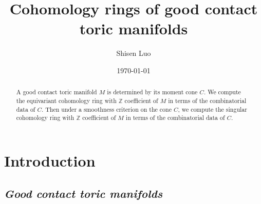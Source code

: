 \documentclass[12pt]{amsart}
\def\Z {{\mathbb{Z}}}
\theoremstyle{definition}
\numberwithin{equation}{section}
\begin{document}
\title{Cohomology rings of good contact toric manifolds}

\author{Shisen Luo}

\address{Department of Mathematics, Cornell University,
Ithaca, NY 14853-4201, USA}



\begin{abstract}
A good contact toric manifold $M$ is determined by its moment cone
$C$. We compute the equivariant cohomology ring with $\Z$
coefficient of $M$ in terms of the combinatorial data of $C$. Then
under a smoothness criterion on the cone $C$, we compute the
singular cohomology ring with $\Z$ coefficient of $M$ in terms of
the combinatorial data of $C$.
\end{abstract}

\date{\today}

\maketitle \tableofcontents
\section{\bf Introduction}\label{sec:introduction}

\subsection{\it Good contact toric manifolds}
\end{document}
